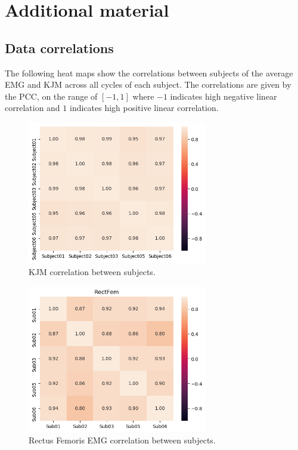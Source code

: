 

\chapter{Additional material}
\label{sec:appendix}



\newpage
\section{Data correlations}
\label{sec:A-data-correlations}
The following heat maps show the correlations between subjects of the average \ac{EMG} and \ac{KJM} across all cycles of each subject.
The correlations are given by the \ac{PCC}, on the range of $[-1, 1]$ where $-1$ indicates high negative linear correlation and $1$ indicates high positive linear correlation.
\begin{figure}[ht!]
    \centering
    \includegraphics[width=0.7\textwidth]{img/results/correlations/KJM_correlation_between_subjects.png}
    \caption{\ac{KJM} correlation between subjects.}
    \label{fig:kjm-correlation}
\end{figure}
\begin{figure}[ht!]
    \centering
    \includegraphics[width=0.7\textwidth]{img/results/correlations/RectFem_correlation_between_subjects.png}
    \caption{Rectus Femoris \ac{EMG} correlation between subjects.}
    \label{fig:rectfem-correlation}
\end{figure}
